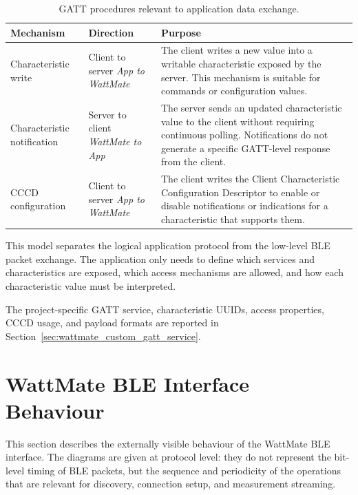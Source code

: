 \begin{table}[H]
	\centering
	\small
	\caption{GATT procedures relevant to application data exchange.}
	\label{tab:ble_gatt_procedures}
	\begin{tabular}{p{} p{} p{}}
		\toprule
		\textbf{Mechanism} & \textbf{Direction} & \textbf{Purpose} \\
		\midrule
		Characteristic write &
		Client to server \newline
		\emph{App to WattMate} &
		The client writes a new value into a writable characteristic exposed by the server. 
		This mechanism is suitable for commands or configuration values. \\
		
		Characteristic notification &
		Server to client \newline
		\emph{WattMate to App} &
		The server sends an updated characteristic value to the client without requiring continuous polling. 
		Notifications do not generate a specific GATT-level response from the client. \\
		
		CCCD configuration &
		Client to server \newline
		\emph{App to WattMate} &
		The client writes the Client Characteristic Configuration Descriptor to enable or disable notifications or indications for a characteristic that supports them. \\
		\bottomrule
	\end{tabular}
\end{table}


This model separates the logical application protocol from the low-level BLE packet exchange. 
The application only needs to define which services and characteristics are exposed, which access mechanisms are allowed, and how each characteristic value must be interpreted.

The project-specific GATT service, characteristic UUIDs, access properties, CCCD usage, and payload formats are reported in Section~\ref{sec:wattmate_custom_gatt_service}.








\section{WattMate BLE Interface Behaviour}
\label{sec:wattmate_ble_interface_behaviour}

This section describes the externally visible behaviour of the WattMate BLE interface. 
The diagrams are given at protocol level: they do not represent the bit-level timing of BLE packets, but the sequence and periodicity of the operations that are relevant for discovery, connection setup, and measurement streaming.

